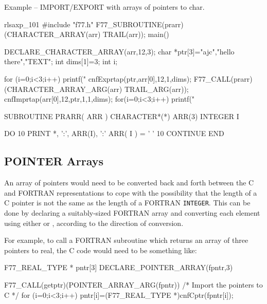 \documentclass[twoside,11pt,nolof]{starlink}
\newcounter{examples}
\begin{document}
\label{cook_exprtap}
\begin{center}
Example\latex{~\ref{cook_exprtap}}
-- IMPORT/EXPORT with arrays of pointers to char.
\end{center}
\begin{small}
\begin{terminalv}
rlsaxp_101%
#include "f77.h"
F77_SUBROUTINE(prarr)(CHARACTER_ARRAY(arr) TRAIL(arr));
main() {
DECLARE_CHARACTER_ARRAY(arr,12,3);
char *ptr[3]={"ajc","hello there","TEXT"};
int dims[1]=3;
int i;

for (i=0;i<3;i++) printf("%
cnfExprtap(ptr,arr[0],12,1,dims);
F77_CALL(prarr)(CHARACTER_ARRAY_ARG(arr) TRAIL_ARG(arr));
cnfImprtap(arr[0],12,ptr,1,1,dims);
for(i=0;i<3;i++) printf("%
}
\end{terminalv}
\end{small}
\begin{small}
\begin{terminalv}
      SUBROUTINE PRARR( ARR )
      CHARACTER*(*) ARR(3)
      INTEGER I

      DO 10
         PRINT *, ':', ARR(I), ':'
         ARR( I ) = ' '
10    CONTINUE
      END
\end{terminalv}
\end{small}

\subsection{POINTER Arrays}
An array of pointers would need to be converted back and forth between
the C and FORTRAN representations to cope with the possibility that
the length of a C pointer is not the same as the length of a FORTRAN
\texttt{INTEGER}. This can be done by declaring a suitably-sized
FORTRAN array and converting each element using either
or
,
according to the direction of conversion.

For example, to call a FORTRAN subroutine which returns an array of three
pointers to real, the C code would need to be something like:
\begin{small}
\begin{terminalv}
F77_REAL_TYPE * pntr[3]
DECLARE_POINTER_ARRAY(fpntr,3)

F77_CALL(getptr)(POINTER_ARRAY_ARG(fpntr))
/* Import the pointers to C */
for (i=0;i<3;i++) pntr[i]=(F77_REAL_TYPE *)cnfCptr(fpntr[i]);
\end{terminalv}
\end{small}
\end{document}
